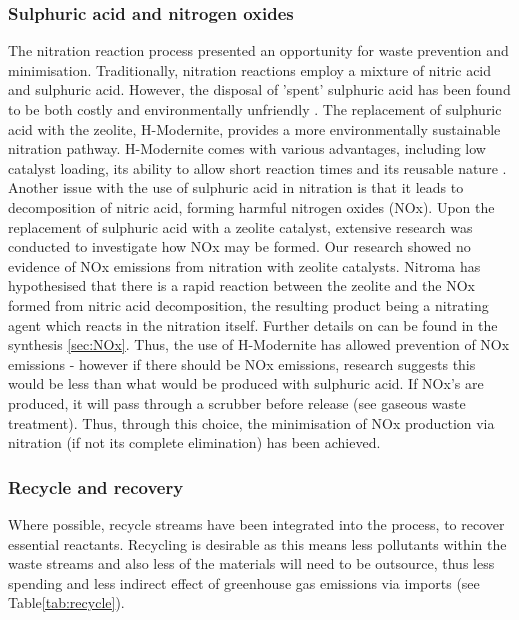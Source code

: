 \subsubsection{Sulphuric acid and nitrogen oxides}
The nitration reaction process presented an opportunity for waste prevention and minimisation. Traditionally, nitration reactions employ a mixture of nitric acid and sulphuric acid. However, the disposal of 'spent' sulphuric acid has been found to be both costly and environmentally unfriendly \cite{smith_superior_1996}. The replacement of sulphuric acid with the zeolite, H-Modernite, provides a more environmentally sustainable nitration pathway. H-Modernite comes with various advantages, including low catalyst loading, its ability to allow short reaction times and its reusable nature \cite{smith_superior_1996}. Another issue with the use of sulphuric acid in nitration is that it leads to decomposition of nitric acid, forming harmful nitrogen oxides (NOx). Upon the replacement of sulphuric acid with a zeolite catalyst, extensive research was conducted to investigate how NOx may be formed. Our research showed no evidence of NOx emissions from nitration with zeolite catalysts. Nitroma has hypothesised that there is a rapid reaction between the zeolite and the NOx formed from nitric acid decomposition, the resulting product being a nitrating agent which reacts in the nitration itself. Further details on can be found in the synthesis \cref{sec:NOx}. Thus, the use of H-Modernite has allowed prevention of NOx emissions - however if there should be NOx emissions, research suggests this would be less than what would be produced with sulphuric acid. If NOx's are produced, it will pass through a scrubber before release (see gaseous waste treatment). Thus, through this choice, the minimisation of NOx production via nitration (if not its complete elimination) has been achieved. 

\subsubsection{Recycle and recovery}

Where possible, recycle streams have been integrated into the process, to recover essential reactants. Recycling is desirable as this means less pollutants within the waste streams and also less of the materials will need to be outsource, thus less spending and less indirect effect of greenhouse gas emissions via imports (see Table\ref{tab:recycle}).


